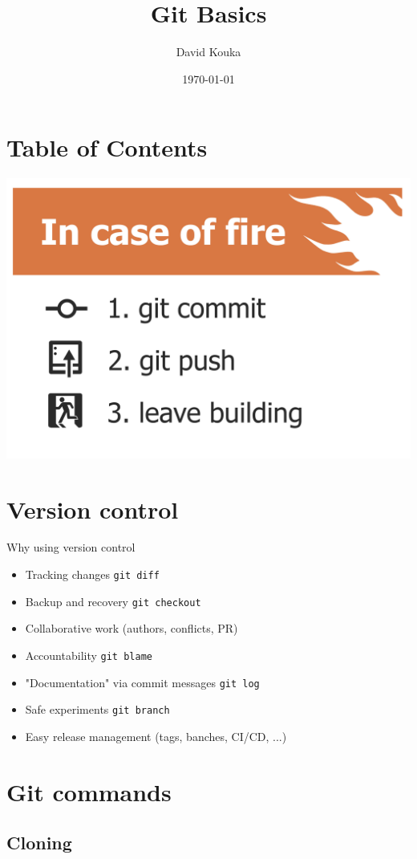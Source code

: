 \documentclass{beamer}
\title{Git Basics}
\author{David Kouka}
\date{\today}
\begin{document}
\frame{\titlepage}  %

\section{Table of Contents}

\begin{frame}
\tableofcontents
    \begin{center}
        \includegraphics[width=0.5\linewidth]{img/in_case_of_fire.jpg}
    \end{center}
\end{frame}

\section{Version control}

\begin{frame}{Why using version control}
    \begin{itemize}
        \item<1-> Tracking changes \lstinline{git diff}
        \item<2-> Backup and recovery \lstinline{git checkout}
        \item<3-> Collaborative work (authors, conflicts, PR)
        \item<4-> Accountability \lstinline{git blame}
        \item<5-> "Documentation" via commit messages \lstinline{git log}
        \item<6-> Safe experiments \lstinline{git branch}
        \item<7-> Easy release management (tags, banches, CI/CD, ...)
    \end{itemize}
\end{frame}

\section{Git commands}

\subsection{Cloning}
\end{document}
